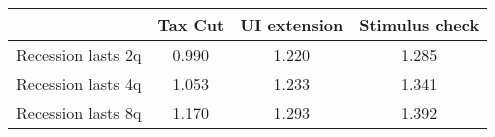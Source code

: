 \begin{tabular}{@{}lccc@{}} 
\toprule 
& Tax Cut    & UI extension    & Stimulus check    \\  \midrule 
Recession lasts 2q &0.990  & 1.220  & 1.285     \\ 
Recession lasts 4q &1.053  & 1.233  & 1.341     \\ 
Recession lasts 8q &1.170  & 1.293  & 1.392     \\ 
\end{tabular}  
